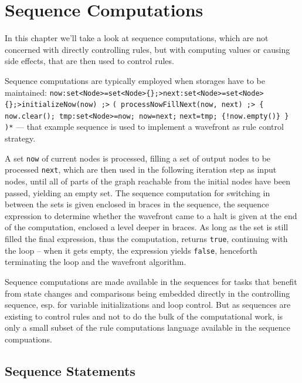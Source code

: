 
\chapter{Sequence Computations}\label{seqcomp}

In this chapter we'll take a look at sequence computations, which are not concerned with directly controlling rules, but with computing values or causing side effects, that are then used to control rules.

\begin{example}
Sequence computations are typically employed when storages have to be maintained:
\verb#now:set<Node>=set<Node>{};>next:set<Node>=set<Node>{};>initializeNow(now) ;>#
\verb#( processNowFillNext(now, next) ;> { now.clear(); tmp:set<Node>=now; now=next;#
\verb#next=tmp; {!now.empty()} } )*#
--- that example sequence is used to implement a wavefront as rule control strategy.

A set \texttt{now} of current nodes is processed, filling a set of output nodes to be processed \texttt{next}, which are then used in the following iteration step as input nodes, until all of parts of the graph reachable from the initial nodes have been passed, yielding an empty set.
The sequence computation for switching in between the sets is given enclosed in braces in the sequence, 
the sequence expression to determine whether the wavefront came to a halt is given at the end of the computation,
enclosed a level deeper in braces.
As long as the set is still filled the final expression, thus the computation, returns \texttt{true}, continuing with the loop -- when it gets empty, the expression yields \texttt{false}, henceforth terminating the loop and the wavefront algorithm.

Sequence computations are made available in the sequences for tasks that benefit from state changes and comparisons being embedded directly in the controlling sequence, esp. for variable initializations and loop control.
But as sequences are existing to control rules and not to do the bulk of the computational work,
is only a small subset of the rule computations language available in the sequence compuations. 
\end{example}


\section{Sequence Statements} \label{sec:seqcomp}

